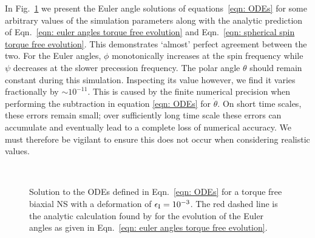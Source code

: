 \documentclass[../full_thesis/full_thesis.tex]{subfiles}
\begin{document}
In Fig.~\ref{fig: biaxial body no torque} we present the Euler angle solutions
of equations~\eqref{eqn: ODEs} for some arbitrary values of the simulation
parameters along with the analytic prediction of Eqn.~\eqref{eqn: euler angles
torque free evolution} and Eqn.~\eqref{eqn: spherical spin torque free
evolution}. This demonstrates `almost' perfect agreement between the two. For
the Euler angles, $\phi$ monotonically
increases at the spin frequency while $\psi$ decreases at the slower precession
frequency. The polar angle $\theta$ should remain constant during this
simulation. Inspecting its value however, we find it varies fractionally by
$\sim 10^{-11}$.  This is caused by the finite numerical precision when
performing the subtraction in equation \eqref{eqn: ODEs} for $\dot{\theta}$. On
short time scales, these errors remain small; over sufficiently long time scale
these errors can accumulate and eventually lead to a complete loss of numerical
accuracy. We must therefore be vigilant to ensure this does not occur when
considering realistic values.
\afterpage{\clearpage}
\begin{figure}[p]
    \centering
{} \\
\caption{Solution to the ODEs defined in Eqn.~\eqref{eqn: ODEs} for a
torque free biaxial NS with a deformation of $\epsilon_{\mathrm{I}} = 10^{-3}$. The red
dashed line is the analytic calculation found by \citet{Jones2001} for the
evolution of the Euler angles as given in Eqn.~\eqref{eqn: euler angles torque free evolution}.}
\label{fig: biaxial body no torque}
\end{figure}
\end{document}
